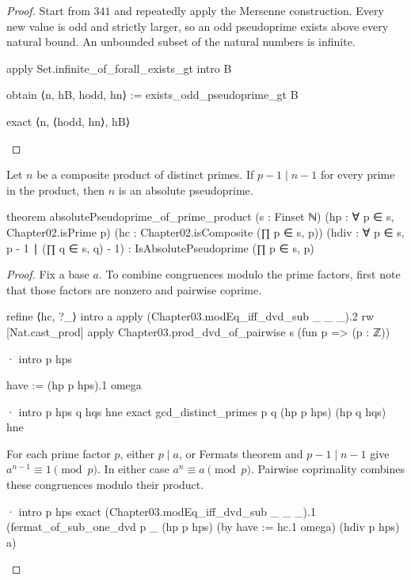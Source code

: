 \begin{proof}
  Start from $341$ and repeatedly apply the Mersenne construction.
  Every new value is odd and strictly larger, so an odd pseudoprime exists above every natural
  bound.
  An unbounded subset of the natural numbers is infinite.

  \begin{lean}
    apply Set.infinite_of_forall_exists_gt
    intro B

    obtain ⟨n, hB, hodd, hn⟩ := exists_odd_pseudoprime_gt B

    exact ⟨n, ⟨hodd, hn⟩, hB⟩
  \end{lean}
\end{proof}

\begin{theorem}
  \label{ent:thm:absolutepseudoprime-of-prime-product}
  Let $n$ be a composite product of distinct primes.
  If $p-1\mid n-1$ for every prime in the product, then $n$ is an absolute pseudoprime.

  \begin{lean}
    theorem absolutePseudoprime_of_prime_product (s : Finset ℕ)
        (hp : ∀ p ∈ s, Chapter02.isPrime p)
        (hc : Chapter02.isComposite (∏ p ∈ s, p))
        (hdiv : ∀ p ∈ s, p - 1 ∣ (∏ q ∈ s, q) - 1) :
        IsAbsolutePseudoprime (∏ p ∈ s, p)
  \end{lean}
\end{theorem}

\begin{proof}
  Fix a base $a$.
  To combine congruences modulo the prime factors, first note that those factors are nonzero and
  pairwise coprime.

  \begin{lean}
    refine ⟨hc, ?_⟩
    intro a
    apply (Chapter03.modEq_iff_dvd_sub _ _ _).2
    rw [Nat.cast_prod]
    apply Chapter03.prod_dvd_of_pairwise s (fun p => (p : ℤ))

    · intro p hps

      have := (hp p hps).1
      omega

    · intro p hps q hqs hne
      exact gcd_distinct_primes p q (hp p hps) (hp q hqs) hne
  \end{lean}

  For each prime factor $p$, either $p\mid a$, or Fermat\textquotesingle s theorem and $p-1\mid
    n-1$ give $a^{n-1}\equiv1\pmod p$.
  In either case $a^n\equiv a\pmod p$.
  Pairwise coprimality combines these congruences modulo their product.

  \begin{lean}
    · intro p hps
      exact (Chapter03.modEq_iff_dvd_sub _ _ _).1
        (fermat_of_sub_one_dvd p _ (hp p hps) (by
            have := hc.1
            omega) (hdiv p hps) a)
  \end{lean}
\end{proof}

